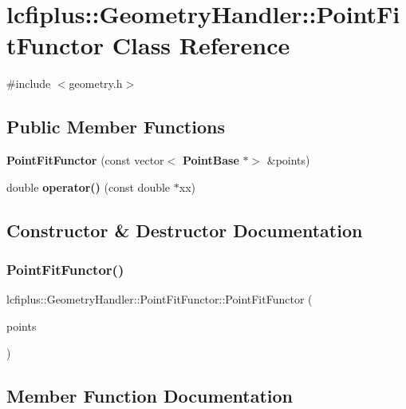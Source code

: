 \section{lcfiplus\+:\+:Geometry\+Handler\+:\+:Point\+Fit\+Functor Class Reference}
\label{classlcfiplus_1_1GeometryHandler_1_1PointFitFunctor}


{\ttfamily \#include $<$geometry.\+h$>$}

\subsection*{Public Member Functions}
\begin{DoxyCompactItemize}
\item 
\textbf{ Point\+Fit\+Functor} (const vector$<$ \textbf{ Point\+Base} $\ast$$>$ \&points)
\item 
double \textbf{ operator()} (const double $\ast$xx)
\end{DoxyCompactItemize}


\subsection{Constructor \& Destructor Documentation}
\mbox{\label{classlcfiplus_1_1GeometryHandler_1_1PointFitFunctor_a75154c1c570519e2f4cc6ee2f003f9d6}} 
\subsubsection{Point\+Fit\+Functor()}
{\footnotesize\ttfamily lcfiplus\+::\+Geometry\+Handler\+::\+Point\+Fit\+Functor\+::\+Point\+Fit\+Functor (\begin{DoxyParamCaption}\item[{const vector$<$ \textbf{ Point\+Base} $\ast$$>$ \&}]{points }\end{DoxyParamCaption})\hspace{0.3cm}{\ttfamily [inline]}}



\subsection{Member Function Documentation}
\mbox{\label{classlcfiplus_1_1GeometryHandler_1_1PointFitFunctor_a7b42c91023b84a543e9f965ddabb1d7d}} 
